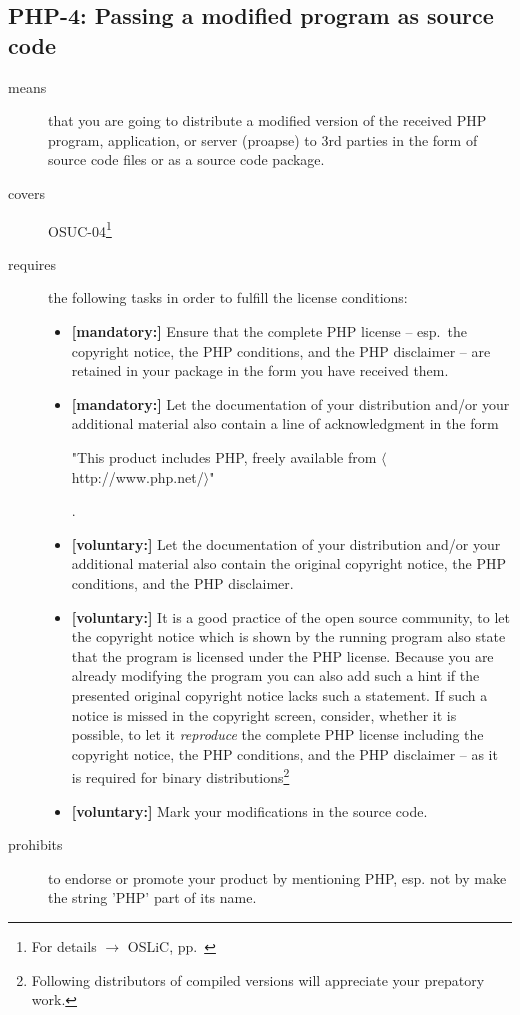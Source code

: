 \subsection{PHP-4: Passing a modified program as source code}
\label{OSUC-04-PHP}

\begin{description}
\item[means] that you are going to distribute a modified version of the received
PHP program, application, or server (proapse) to 3rd parties in the form of
source code files or as a source code package.
\item[covers] OSUC-04\footnote{For details $\rightarrow$ OSLiC, pp.\ \pageref{OSUC-04-DEF}}
\item[requires] the following tasks in order to fulfill the license conditions:
\begin{itemize}

  \item \textbf{[mandatory:]} Ensure that the complete PHP license -- esp.\
  the copyright notice, the PHP conditions, and the PHP disclaimer -- are
  retained in your package in the form you have received them.
  
  \item \textbf{[mandatory:]} Let the documentation of your distribution and/or
  your additional material also contain a line of acknowledgment in the form
  \begin{footnotesize}"This product includes PHP, freely available from
  $\langle$http://www.php.net/$\rangle$"\end{footnotesize}.
    
  \item \textbf{[voluntary:]} Let the documentation of your distribution and/or
  your additional material also contain the original copyright notice, the PHP
  conditions, and the PHP disclaimer.
     
  \item \textbf{[voluntary:]} It is a good practice of the open source
  community, to let the copyright notice which is shown by the running program
  also state that the program is licensed under the PHP license. Because you are
  already modifying the program you can also add such a hint if the presented
  original copyright notice lacks such a statement. If such a notice is missed
  in the copyright screen, consider, whether it is possible, to let it
  \emph{reproduce} the complete PHP license including the copyright notice, the
  PHP conditions, and the PHP disclaimer -- as it is required for binary
  distributions\footnote{Following distributors of compiled versions will
  appreciate your prepatory work.}
  
  \item \textbf{[voluntary:]} Mark your modifications in the source code.
  
  
\end{itemize}

\item[prohibits] to endorse or promote your product by mentioning PHP, esp. not
by make the string 'PHP' part of its name.

\end{description}

